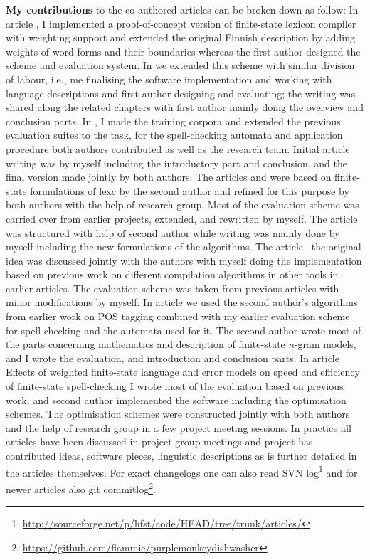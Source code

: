 \documentclass[officiallayout]{unihelcompling}
\begin{document}
\textbf{My contributions} to the co-authored articles can be broken down as
follow: In article , I implemented a
proof-of-concept version of finite-state lexicon compiler with weighting
support and extended the original Finnish description by adding weights of
word forms and their boundaries whereas the first author designed the scheme
and evaluation system. In  we extended this
scheme with similar division of labour, i.e., me finalising the software
implementation and working with language descriptions and first author
designing and evaluating; the writing was shared along the related chapters
with first author mainly doing the overview and conclusion parts. In
, I made the training corpora and extended
the previous evaluation suites to the task, for the spell-checking automata and
application procedure both authors contributed as well as the research team.
Initial article writing was by myself including the introductory part and
conclusion, and the final version made jointly by both authors. The articles
 and  were
based on finite-state formulations of lexc by the second author and refined for
this purpose by both authors with the help of research group. Most of the
evaluation scheme was carried over from earlier projects, extended, and
rewritten by myself. The article was structured with help of second author
while writing was mainly done by myself including the new formulations of the
algorithms. The article~ the original idea was
discussed jointly with the authors with myself doing the implementation based
on previous work on different compilation algorithms in other tools in earlier
articles.  The evaluation scheme was taken from previous articles with minor
modifications by myself. In article  we used
the second author's algorithms from earlier work on POS tagging combined with
my earlier evaluation scheme for spell-checking and the automata used for it.
The second author wrote most of the parts concerning mathematics and
description of finite-state \(n\)-gram models, and I wrote the evaluation, and
introduction and conclusion parts. In article 
Effects of weighted finite-state language and error models on speed and
efficiency of finite-state spell-checking I wrote most of the evaluation based
on previous work, and second author implemented the software including the
optimisation schemes. The optimisation schemes were constructed jointly with
both authors and the help of research group in a few project meeting sessions.
In practice all articles have been discussed in project group meetings and
project has contributed ideas, software pieces, linguistic descriptions as is
further detailed in the articles themselves. For exact changelogs one can also
read SVN
log\footnote{\url{http://sourceforge.net/p/hfst/code/HEAD/tree/trunk/articles/}}
and for newer articles also git
commitlog\footnote{\url{https://github.com/flammie/purplemonkeydishwasher}}.
\end{document}
